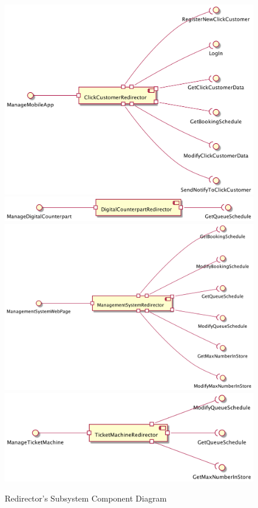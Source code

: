 \documentclass[a4paper,12pt]{report}
\begin{document}
\begin{figure}
	\centering
	\includegraphics[scale=0.2]{component_diagram_ClickCustomerRedirector}
	\vspace{10mm}
	\includegraphics[scale=0.2]{component_diagram_DigitalCounterpartRedirector}
	\vspace{10mm}
	\includegraphics[scale=0.2]{component_diagram_ManagementSystemRedirector}
	\vspace{10mm}
	\includegraphics[scale=0.2]{component_diagram_TicketMachineRedirector}
	\vspace{10mm}
	\caption{Redirector's Subsystem Component Diagram}
	\centering
	\label{fig:component_diagram_RedirectoSubsystem}
\end{figure}
\end{document}
